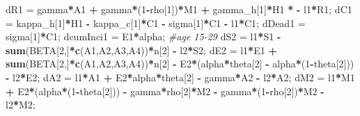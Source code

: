 \documentclass[
]{article}
\newenvironment{Shaded}{\begin{snugshade}}{\end{snugshade}}
\newcommand{\CommentTok}[1]{\textcolor[rgb]{0.56,0.35,0.01}{\textit{#1}}}
\newcommand{\DecValTok}[1]{\textcolor[rgb]{0.00,0.00,0.81}{#1}}
\newcommand{\KeywordTok}[1]{\textcolor[rgb]{0.13,0.29,0.53}{\textbf{#1}}}
\newcommand{\NormalTok}[1]{#1}
\newcommand{\OperatorTok}[1]{\textcolor[rgb]{0.81,0.36,0.00}{\textbf{#1}}}
\newcommand{\StringTok}[1]{\textcolor[rgb]{0.31,0.60,0.02}{#1}}
\begin{document}
\begin{Shaded}
\begin{Highlighting}[]
\NormalTok{    dR1 =}\StringTok{ }\NormalTok{gamma}\OperatorTok{*}\NormalTok{A1 }\OperatorTok{+}\StringTok{ }\NormalTok{gamma}\OperatorTok{*}\NormalTok{(}\DecValTok{1}\OperatorTok{-}\NormalTok{rho[}\DecValTok{1}\NormalTok{])}\OperatorTok{*}\NormalTok{M1 }\OperatorTok{+}\StringTok{ }\NormalTok{gamma_h[}\DecValTok{1}\NormalTok{]}\OperatorTok{*}\NormalTok{H1 }\OperatorTok{*}\StringTok{ }\OperatorTok{-}\StringTok{ }\NormalTok{l1}\OperatorTok{*}\NormalTok{R1;}
\NormalTok{    dC1 =}\StringTok{ }\NormalTok{kappa_h[}\DecValTok{1}\NormalTok{]}\OperatorTok{*}\NormalTok{H1 }\OperatorTok{-}\StringTok{ }\NormalTok{kappa_c[}\DecValTok{1}\NormalTok{]}\OperatorTok{*}\NormalTok{C1 }\OperatorTok{-}\StringTok{ }\NormalTok{sigma[}\DecValTok{1}\NormalTok{]}\OperatorTok{*}\NormalTok{C1 }\OperatorTok{-}\StringTok{ }\NormalTok{l1}\OperatorTok{*}\NormalTok{C1;}
\NormalTok{    dDead1 =}\StringTok{ }\NormalTok{sigma[}\DecValTok{1}\NormalTok{]}\OperatorTok{*}\NormalTok{C1;}
\NormalTok{    dcumInci1 =}\StringTok{ }\NormalTok{E1}\OperatorTok{*}\NormalTok{alpha;}
  \CommentTok{#age 15-29}
\NormalTok{    dS2 =}\StringTok{ }\NormalTok{l1}\OperatorTok{*}\NormalTok{S1 }\OperatorTok{-}\StringTok{ }\KeywordTok{sum}\NormalTok{(BETA[}\DecValTok{2}\NormalTok{,]}\OperatorTok{*}\KeywordTok{c}\NormalTok{(A1,A2,A3,A4))}\OperatorTok{*}\NormalTok{n[}\DecValTok{2}\NormalTok{] }\OperatorTok{-}\StringTok{ }\NormalTok{l2}\OperatorTok{*}\NormalTok{S2;}
\NormalTok{    dE2 =}\StringTok{ }\NormalTok{l1}\OperatorTok{*}\NormalTok{E1 }\OperatorTok{+}\StringTok{ }\KeywordTok{sum}\NormalTok{(BETA[}\DecValTok{2}\NormalTok{,]}\OperatorTok{*}\KeywordTok{c}\NormalTok{(A1,A2,A3,A4))}\OperatorTok{*}\NormalTok{n[}\DecValTok{2}\NormalTok{] }\OperatorTok{-}\StringTok{ }\NormalTok{E2}\OperatorTok{*}\NormalTok{(alpha}\OperatorTok{*}\NormalTok{theta[}\DecValTok{2}\NormalTok{] }\OperatorTok{-}\StringTok{ }\NormalTok{alpha}\OperatorTok{*}\NormalTok{(}\DecValTok{1}\OperatorTok{-}\NormalTok{theta[}\DecValTok{2}\NormalTok{])) }\OperatorTok{-}\StringTok{ }\NormalTok{l2}\OperatorTok{*}\NormalTok{E2;}
\NormalTok{    dA2 =}\StringTok{ }\NormalTok{l1}\OperatorTok{*}\NormalTok{A1 }\OperatorTok{+}\StringTok{ }\NormalTok{E2}\OperatorTok{*}\NormalTok{alpha}\OperatorTok{*}\NormalTok{theta[}\DecValTok{2}\NormalTok{] }\OperatorTok{-}\StringTok{ }\NormalTok{gamma}\OperatorTok{*}\NormalTok{A2 }\OperatorTok{-}\StringTok{ }\NormalTok{l2}\OperatorTok{*}\NormalTok{A2;}
\NormalTok{    dM2 =}\StringTok{ }\NormalTok{l1}\OperatorTok{*}\NormalTok{M1 }\OperatorTok{+}\StringTok{ }\NormalTok{E2}\OperatorTok{*}\NormalTok{(alpha}\OperatorTok{*}\NormalTok{(}\DecValTok{1}\OperatorTok{-}\NormalTok{theta[}\DecValTok{2}\NormalTok{])) }\OperatorTok{-}\StringTok{ }\NormalTok{gamma}\OperatorTok{*}\NormalTok{rho[}\DecValTok{2}\NormalTok{]}\OperatorTok{*}\NormalTok{M2 }\OperatorTok{-}\StringTok{ }\NormalTok{gamma}\OperatorTok{*}\NormalTok{(}\DecValTok{1}\OperatorTok{-}\NormalTok{rho[}\DecValTok{2}\NormalTok{])}\OperatorTok{*}\NormalTok{M2 }\OperatorTok{-}\StringTok{ }\NormalTok{l2}\OperatorTok{*}\NormalTok{M2;}

\end{Highlighting}
\end{Shaded}
\end{document}
